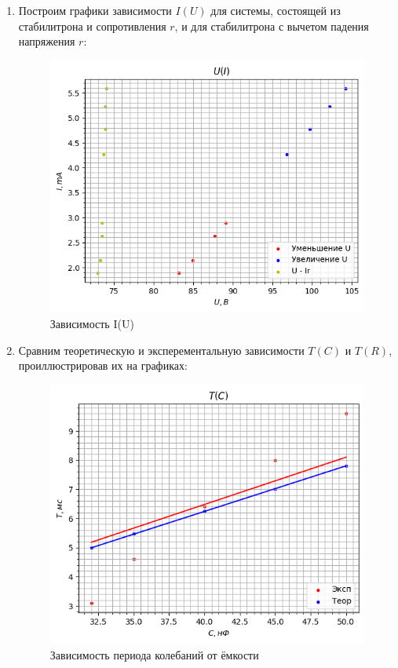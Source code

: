 \documentclass[a4paper,12pt]{article} %
\begin{document}
\begin{enumerate}
   


 \item  Построим графики зависимости $I(U)$ для системы, состоящей из стабилитрона и сопротивления $r$, и для стабилитрона с вычетом падения напряжения $r$:

\begin{figure}[h]
    \centering
    \includegraphics[scale=0.65]{F(x).png}
    \caption{Зависимость I(U)}
    \label{tc}
\end{figure}

 \item  Сравним теоретическую и эксперементальную зависимости $T(C)$ и $T(R)$, проиллюстрировав их на графиках:

\begin{figure}[H]
    \centering
    \includegraphics[scale=0.7]{tttt.png}
    \caption{Зависимость периода колебаний от ёмкости}
    \label{tc}
\end{figure}


\end{enumerate}
\end{document}
